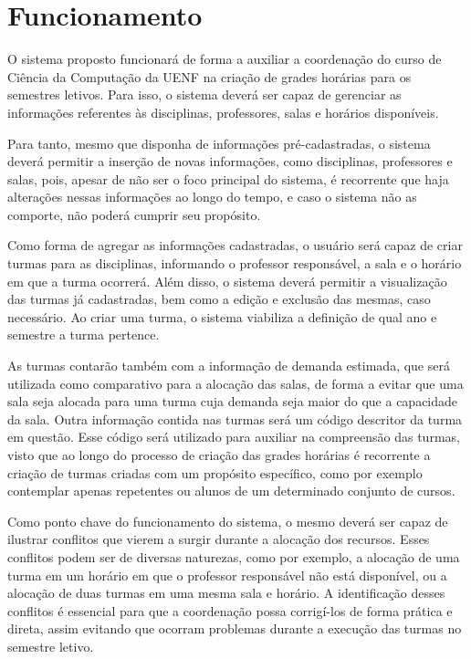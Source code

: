 \section{Funcionamento} \label{sec:funcionamento} %

O sistema proposto funcionará de forma a auxiliar a coordenação do curso de Ciência da Computação da UENF na criação de grades horárias para os semestres letivos. Para isso, o sistema deverá ser capaz de gerenciar as informações referentes às disciplinas, professores, salas e horários disponíveis.

Para tanto, mesmo que disponha de informações pré-cadastradas, o sistema deverá permitir a inserção de novas informações, como disciplinas, professores e salas, pois, apesar de não ser o foco principal do sistema, é recorrente que haja alterações nessas informações ao longo do tempo, e caso o sistema não as comporte, não poderá cumprir seu propósito.

Como forma de agregar as informações cadastradas, o usuário será capaz de criar turmas para as disciplinas, informando o professor responsável, a sala e o horário em que a turma ocorrerá. Além disso, o sistema deverá permitir a visualização das turmas já cadastradas, bem como a edição e exclusão das mesmas, caso necessário. Ao criar uma turma, o sistema viabiliza a definição de qual ano e semestre a turma pertence.

As turmas contarão também com a informação de demanda estimada, que será utilizada como comparativo para a alocação das salas, de forma a evitar que uma sala seja alocada para uma turma cuja demanda seja maior do que a capacidade da sala. Outra informação contida nas turmas será um código descritor da turma em questão. Esse código será utilizado para auxiliar na compreensão das turmas, visto que ao longo do processo de criação das grades horárias é recorrente a criação de turmas criadas com um propósito específico, como por exemplo contemplar apenas repetentes ou alunos de um determinado conjunto de cursos.

Como ponto chave do funcionamento do sistema, o mesmo deverá ser capaz de ilustrar conflitos que vierem a surgir durante a alocação dos recursos. Esses conflitos podem ser de diversas naturezas, como por exemplo, a alocação de uma turma em um horário em que o professor responsável não está disponível, ou a alocação de duas turmas em uma mesma sala e horário. A identificação desses conflitos é essencial para que a coordenação possa corrigí-los de forma prática e direta, assim evitando que ocorram problemas durante a execução das turmas no semestre letivo.

